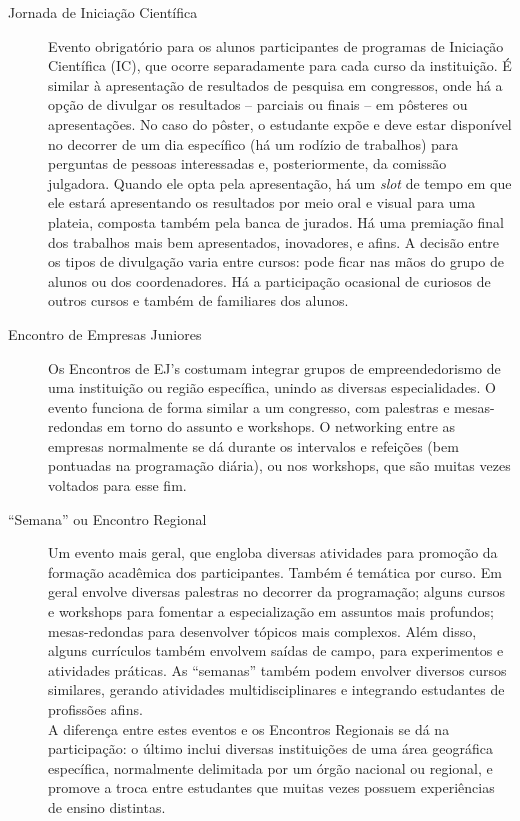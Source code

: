 \documentclass[12pt,a4paper,twoside,hyphens,english,brazil]{abntex2}
\begin{document}
\begin{description}
	\item[Jornada de Iniciação Científica] Evento obrigatório para os alunos participantes de programas de Iniciação Científica (IC), que ocorre separadamente para cada curso da instituição. É similar à apresentação de resultados de pesquisa em congressos, onde há a opção de divulgar os resultados -- parciais ou finais -- em pôsteres ou apresentações. No caso do pôster, o estudante expõe e deve estar disponível no decorrer de um dia específico (há um rodízio de trabalhos) para perguntas de pessoas interessadas e, posteriormente, da comissão julgadora. Quando ele opta pela apresentação, há um \emph{slot} de tempo em que ele estará apresentando os resultados por meio oral e visual para uma plateia, composta também pela banca de jurados. Há uma premiação final dos trabalhos mais bem apresentados, inovadores, e afins. A decisão entre os tipos de divulgação varia entre cursos: pode ficar nas mãos do grupo de alunos ou dos coordenadores. Há a participação ocasional de curiosos de outros cursos e também de familiares dos alunos.
			
	\item[Encontro de Empresas Juniores] Os Encontros de EJ's costumam integrar grupos de empreendedorismo de uma instituição ou região específica, unindo as diversas especialidades. O evento funciona de forma similar a um congresso, com palestras e mesas-redondas em torno do assunto e workshops. O networking entre as empresas normalmente se dá durante os intervalos e refeições (bem pontuadas na programação diária\cite{enej15}), ou nos workshops, que são muitas vezes voltados para esse fim.

	\item[``Semana'' ou Encontro Regional] Um evento mais geral, que engloba diversas atividades para promoção da formação acadêmica dos participantes. Também é temática por curso. Em geral envolve diversas palestras no decorrer da programação; alguns cursos e workshops para fomentar a especialização em assuntos mais profundos; mesas-redondas para desenvolver tópicos mais complexos. Além disso, alguns currículos também envolvem saídas de campo, para experimentos e atividades práticas. As ``semanas'' também podem envolver diversos cursos similares, gerando atividades multidisciplinares e integrando estudantes de profissões afins.\\
	A diferença entre estes eventos e os Encontros Regionais se dá na participação: o último inclui diversas instituições de uma área geográfica específica, normalmente delimitada por um órgão nacional ou regional, e promove a troca entre estudantes que muitas vezes possuem experiências de ensino distintas.
	

\end{description}
\end{document}
